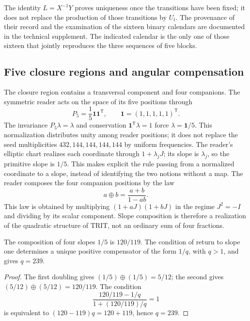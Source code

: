 The identity \(L=X^{-1}Y\) proves uniqueness once the transitions have been fixed; it does not replace the production of those transitions by \(U_t\). The provenance of their record and the examination of the sixteen binary calendars are documented in the technical supplement. The indicated calendar is the only one of those sixteen that jointly reproduces the three sequences of five blocks.





\subsection{Five closure regions and angular compensation}

The closure region contains a transversal component and four companions. The symmetric reader acts on the space of its five positions through
\[
 P_5=\frac15\mathbf1\mathbf1^{\mathsf T},\qquad
 \mathbf1=(1,1,1,1,1)^{\mathsf T}.
\]
The invariance \(P_5\lambda=\lambda\) and conservation \(\mathbf1^{\mathsf T}\lambda=1\) force \(\lambda=\mathbf1/5\). This normalization distributes unity among reader positions; it does not replace the seed multiplicities \(432,144,144,144,144\) by uniform frequencies. The reader's elliptic chart realizes each coordinate through \(1+\lambda_jJ\); its slope is \(\lambda_j\), so the primitive slope is \(1/5\). This makes explicit the rule passing from a normalized coordinate to a slope, instead of identifying the two notions without a map. The reader composes the four companion positions by the law
\begin{equation}
 a\oplus b=\frac{a+b}{1-ab}.
 \label{eq:suma-pendientes}
\end{equation}
This law is obtained by multiplying \((1+aJ)(1+bJ)\) in the regime \(J^2=-I\) and dividing by its scalar component. Slope composition is therefore a realization of the quadratic structure of TRIT, not an ordinary sum of four fractions.

\begin{proposition}
The composition of four slopes \(1/5\) is \(120/119\). The condition of return to slope one determines a unique positive compensator of the form \(1/q\), with \(q>1\), and gives \(q=239\).
\end{proposition}
\begin{proof}
The first doubling gives \((1/5)\oplus(1/5)=5/12\); the second gives \((5/12)\oplus(5/12)=120/119\). The condition
\[
 \frac{120/119-1/q}{1+(120/119)/q}=1
\]
is equivalent to \((120-119)q=120+119\), hence \(q=239\).
\end{proof}

